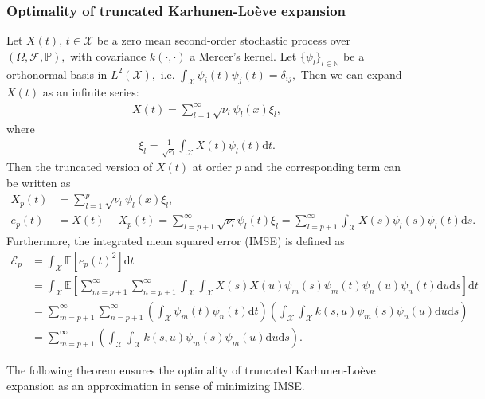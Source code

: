 \documentclass{article}
\begin{document}
\subsubsection{Optimality of truncated Karhunen-Loève expansion}
Let $X(t),\, t\in\mathcal{X}$ be a zero mean second-order stochastic process over $(\Omega,\mathcal{F},\mathbb{P}),$ with covariance $k(\cdot,\cdot)$ a Mercer's kernel. Let $\lbrace\psi_l\rbrace_{l\in\mathbb{N}}$ be a orthonormal basis in $L^2(\mathcal{X}),$ i.e. $\int_\mathcal{X}\psi_i(t)\psi_j(t) = \delta_{ij},$ Then we can expand $X(t)$ as an infinite series:
\begin{align*}
	X(t) = \sum_{l=1}^\infty \sqrt{\nu_l}\psi_l(x)\xi_l,\tag{7.28}
\end{align*}
where
\begin{align*}
	\xi_l = \frac{1}{\sqrt{\nu_l}} \int_\mathcal{X} X(t)\psi_l(t)\mathrm{d}t.\tag{7.29}
\end{align*}
Then the truncated version of $X(t)$ at order $p$ and the corresponding term can be written as
\begin{align*}
	X_p(t) &= \sum_{l=1}^p \sqrt{\nu_l}\psi_l(x)\xi_l,\\
	e_p(t) &= X(t) - X_p(t) = \sum_{l=p+1}^\infty \sqrt{\nu_l}\psi_l(t)\xi_l = \sum_{l=p+1}^\infty\int_\mathcal{X} X(s)\psi_l(s)\psi_l(t)\mathrm{d}s.\tag{7.30}
\end{align*}
Furthermore, the integrated mean squared error (IMSE) is defined as
\begin{align*}
	\mathcal{E}_p &= \int_\mathcal{X}\mathbb{E}\left[e_p(t)^2\right]\mathrm{d}t\\
	&= \int_\mathcal{X}\mathbb{E}\left[\sum_{m=p+1}^\infty\sum_{n=p+1}^\infty\int_\mathcal{X}\int_\mathcal{X}X(s)X(u)\psi_m(s)\psi_m(t)\psi_n(u)\psi_n(t)\mathrm{d}u\mathrm{d}s\right]\mathrm{d}t\\
	&= \sum_{m=p+1}^\infty\sum_{n=p+1}^\infty\left(\int_\mathcal{X}\psi_m(t)\psi_n(t)\mathrm{d}t\right)\left(\int_\mathcal{X}\int_\mathcal{X}k(s,u)\psi_m(s)\psi_n(u)\mathrm{d}u\mathrm{d}s\right)\\
	&= \sum_{m=p+1}^\infty\left(\int_\mathcal{X}\int_\mathcal{X}k(s,u)\psi_m(s)\psi_m(u)\mathrm{d}u\mathrm{d}s\right).\tag{7.31}
\end{align*}

The following theorem ensures the optimality of truncated Karhunen-Loève expansion as an approximation in sense of minimizing IMSE.
\end{document}
